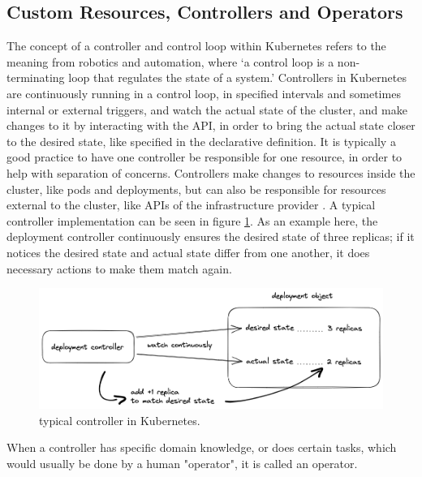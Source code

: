\subsection*{Custom Resources, Controllers and Operators}
The concept of a controller and control loop within Kubernetes refers to the
meaning from robotics and automation, where
\enquote*{a control loop is a non-terminating loop that regulates the state of a system.}
\autocite{controllersKubernetes}
Controllers in Kubernetes are continuously running in a control loop,
in specified intervals and sometimes internal or external triggers, 
and watch the actual state of the cluster,
and make changes to it by interacting with the API,
in order to bring the actual state closer to the desired state,
like specified in the declarative definition.
It is typically a good practice to have one controller
be responsible for one resource, 
in order to help with separation of concerns.
Controllers make changes to resources inside the cluster,
like pods and deployments,
but can also be responsible for resources external to the cluster,
like APIs of the infrastructure provider
\autocite{controllersKubernetes}.
A typical controller implementation can be seen in figure
\ref{fig:typicalControllerKubernetes}.
As an example here, the deployment controller continuously ensures the desired state
of three replicas; if it notices the desired state and actual state differ
from one another, it does necessary actions to make them match again.

\begin{figure}[h]
	\centering
	\includegraphics[width=1.00\linewidth]{assets/typical-controller.png}
	\caption{typical controller in Kubernetes.
	}
	\label{fig:typicalControllerKubernetes}	
\end{figure}

When a controller has specific domain knowledge,
or does certain tasks, which would usually be done by a human "operator",
it is called an operator.

